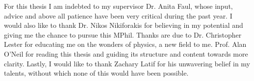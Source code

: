 
\begin{Acknowledgements} 
For this thesis I am indebted to my supervisor Dr. Anita Faul, whose input, advice and above all patience have been very critical during the past year. I would also like to thank Dr. Nikos Nikiforakis for believing in my potential and giving me the chance to pursue this MPhil. Thanks are due to Dr. Christopher Lester for educating me on the wonders of physics, a new field to me. Prof. Alan O'Neil for reading this thesis and guiding its structure and content towards more clarity. Lastly, I would like to thank Zachary Latif for his unwavering belief in my talents, without which none of this would have been possible.
\end{Acknowledgements}